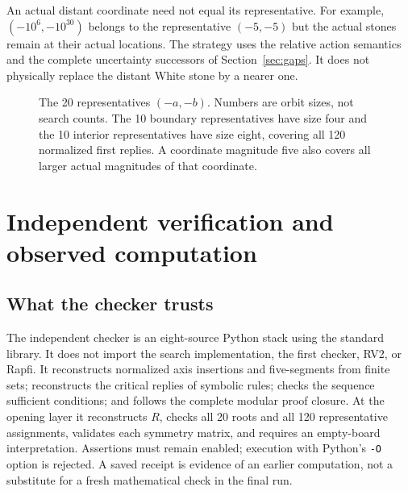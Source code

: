 \documentclass[11pt]{article}
\theoremstyle{definition}
\theoremstyle{remark}
\newcommand{\code}[1]{\texttt{#1}}
\begin{document}
An actual distant coordinate need not equal its representative. For example,
$(-10^6,-10^{30})$ belongs to the representative $(-5,-5)$ but the
actual stones remain at their actual locations. The strategy uses the
relative action semantics and the complete uncertainty successors of
Section~\ref{sec:gaps}. It does not physically replace the distant White
stone by a nearer one.

\begin{figure}[ht]
\centering
{}
\caption{The 20 representatives $(-a,-b)$. Numbers are orbit sizes, not
search counts. The 10 boundary representatives have size four and the
10 interior representatives have size eight, covering all 120 normalized
first replies. A coordinate magnitude five also covers all larger actual
magnitudes of that coordinate.}
\label{fig:orbits}
\end{figure}

\section{Independent verification and observed computation}
\label{sec:compute}
\subsection{What the checker trusts}
The independent checker is an eight-source Python stack using the standard
library. It does not import the search implementation, the first checker,
RV2, or Rapfi. It reconstructs normalized axis insertions and five-segments
from finite sets; reconstructs the critical replies of symbolic rules;
checks the sequence sufficient conditions; and follows the complete
modular proof closure. At the opening layer it reconstructs $R$, checks
all 20 roots and all 120 representative assignments, validates each
symmetry matrix, and requires an empty-board interpretation.
Assertions must remain enabled; execution with Python's \code{-O} option
is rejected. A saved receipt is evidence of an earlier computation, not
a substitute for a fresh mathematical check in the final run.
\end{document}
